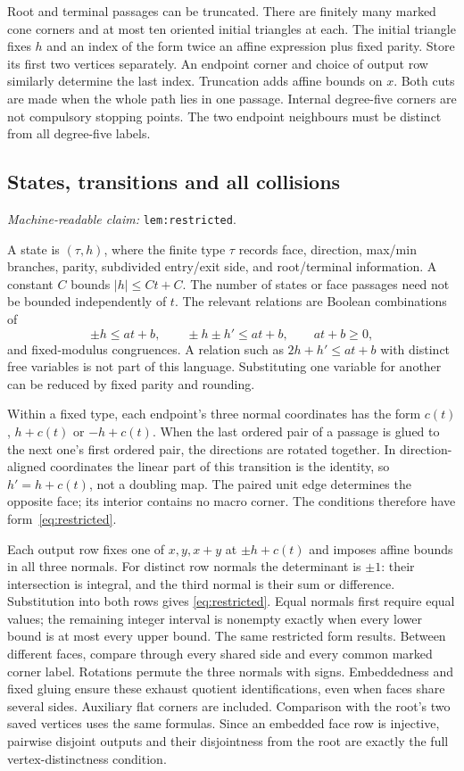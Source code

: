 \documentclass[11pt]{amsart}
\newcommand{\record}[1]{\nolinkurl{#1}}
\newcommand{\claimid}[1]{\par\nopagebreak\noindent\textit{Machine-readable claim:} \record{#1}.\par}
\theoremstyle{definition}\newtheorem{definition}{Definition}
\begin{document}
Root and terminal passages can be truncated. There are finitely many
marked cone corners and at most ten oriented initial triangles at each.
The initial triangle fixes $h$ and an index of the form twice an affine
expression plus fixed parity. Store its first two vertices separately.
An endpoint corner and choice of output row similarly determine the
last index. Truncation adds affine bounds on $x$. Both cuts are made
when the whole path lies in one passage. Internal degree-five corners
are not compulsory stopping points. The two endpoint neighbours must
be distinct from all degree-five labels.

\subsection{States, transitions and all collisions}\label{lem:restricted}
\claimid{lem:restricted}
A state is $(\tau,h)$, where the finite type $\tau$ records face,
direction, max/min branches, parity, subdivided entry/exit side, and
root/terminal information. A constant $C$ bounds $|h|\le Ct+C$.
The number of states or face passages need not be bounded independently
of $t$. The relevant relations are Boolean combinations of
\begin{equation}\label{eq:restricted}
 \pm h\le at+b,\qquad \pm h\pm h'\le at+b,
 \qquad at+b\ge0,
\end{equation}
and fixed-modulus congruences. A relation such as $2h+h'\le at+b$
with distinct free variables is not part of this language. Substituting
one variable for another can be reduced by fixed parity and rounding.

Within a fixed type, each endpoint's three normal coordinates has the
form $c(t)$, $h+c(t)$ or $-h+c(t)$. When the last ordered pair of a
passage is glued to the next one's first ordered pair, the directions
are rotated together. In direction-aligned coordinates the linear part
of this transition is the identity, so $h'=h+c(t)$, not a doubling map.
The paired unit edge determines the opposite face; its interior
contains no macro corner. The conditions therefore have
form~\eqref{eq:restricted}.

Each output row fixes one of $x,y,x+y$ at $\pm h+c(t)$ and imposes
affine bounds in all three normals. For distinct row normals the
determinant is $\pm1$: their intersection is integral, and the third
normal is their sum or difference. Substitution into both rows gives
\eqref{eq:restricted}. Equal normals first require equal values;
the remaining integer interval is nonempty exactly when every lower
bound is at most every upper bound. The same restricted form results.
Between different faces, compare through every shared side and every
common marked corner label. Rotations permute the three normals with
signs. Embeddedness and fixed gluing ensure these exhaust quotient
identifications, even when faces share several sides. Auxiliary flat
corners are included. Comparison with the root's two saved vertices
uses the same formulas. Since an embedded face row is injective,
pairwise disjoint outputs and their disjointness from the root are
exactly the full vertex-distinctness condition.
\end{document}
